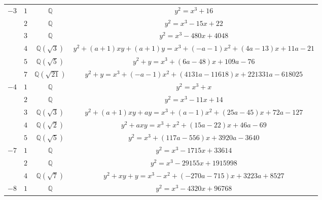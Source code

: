 \documentclass[11pt]{amsart}
\newcommand{\eclabel}[1]{\href{https://www.lmfdb.org/EllipticCurve/Q/#1}{\texttt{#1}}}
\theoremstyle{definition}
\newcommand{\Q}{\mathbb Q}
\newcommand{\QQ}{\mathbb Q}
\begin{document}
{\begin{longtable}{|c|c|c|c|}
{$-3$} & $1$ & $\QQ$& \href{https://www.lmfdb.org/EllipticCurve/Q/27/a/4}{$y^2=x^3+16$}   \\ %
\cline{2-4}
                    & $2$ & $\QQ$  & \href{https://www.lmfdb.org/EllipticCurve/Q/36/a/2}{ $y^2=x^3-15x+22$ } \\ %
\cline{2-4}
             &  $3$ & $\QQ$  & \href{https://www.lmfdb.org/EllipticCurve/Q/27/a/2}{$y^2=x^3-480x+4048$} \\ %
\cline{2-4}
 & $4$ &   $\Q(\sqrt{3})$ & \href{https://www.lmfdb.org/EllipticCurve/2.2.12.1/16.1/a/3}{$y^2+ (a + 1)xy + (a + 1)y = x^3 + (-a - 1)x^2 + (4a - 13)x + 11a - 21$}\\
\cline{2-4}
& $5$ &   $\Q(\sqrt{5})$ & \href{https://www.lmfdb.org/EllipticCurve/2.2.5.1/2025.1/c/1}{$y^2 + y = x^3 + (6a - 48)x + 109a - 76$} \\
\cline{2-4}
& $7$ &   $\Q(\sqrt{21})$ &\href{https://www.lmfdb.org/EllipticCurve/2.2.21.1/49.1/a/1}{$y^2 + y = x^3 + (-a - 1)x^2 + (4131a - 11618)x + 221331a - 618025$} \\
\hline
 {$-4$} & $1$ &  $\QQ$ & \href{https://www.lmfdb.org/EllipticCurve/Q/64/a/4}{$y^2=x^3+x$}\\ %
 \cline{2-4}
   & $2$ &  $\QQ$  & \href{https://www.lmfdb.org/EllipticCurve/Q/32/a/2}{$y^2=x^3-11x+14$}  \\ %
 \cline{2-4}  
& $3$ &   $\Q(\sqrt{3})$ & \href{https://www.lmfdb.org/EllipticCurve/2.2.12.1/9.1/a/1}{$y^2 + (a + 1)xy + ay = x^3 + (a - 1)x^2 + (25a - 45)x + 72a - 127$}\\
\cline{2-4}
& $4$ &   $\Q(\sqrt{2})$ & \href{https://www.lmfdb.org/EllipticCurve/2.2.8.1/32.1/a/1}{$y^2 + axy = x^3 + x^2 + (15a - 22)x + 46a - 69$}\\
\cline{2-4}
& $5$ &   $\Q(\sqrt{5})$ &{$y^2 = x^3 + (117a - 556)x + 3920a - 3640$} \\
\hline
{$-7$} & $1$ & $\QQ$ & \href{https://www.lmfdb.org/EllipticCurve/Q/49/a/2}{$y^2=x^3-1715x+33614$} \\ %
 \cline{2-4}
&  $2$ & $\QQ$ & \href{https://www.lmfdb.org/EllipticCurve/Q/49/a/1}{$y^2=x^3-29155x+1915998$}\\  %
\cline{2-4}
& $4$ &   $\Q(\sqrt{7})$ & \href{https://www.lmfdb.org/EllipticCurve/2.2.28.1/1.1/a/3}{$y^2 + xy + y = x^3 - x^2 + (-270a - 715)x + 3223a + 8527$}\\
\hline
{$-8$}  & $1$ & $\QQ$ & \href{https://www.lmfdb.org/EllipticCurve/Q/256/a/2}{$y^2=x^3-4320x+96768$ }\\ %

\end{longtable}}
\end{document}
